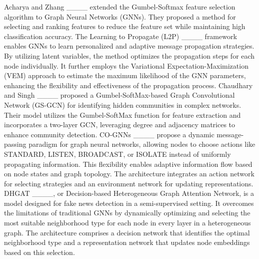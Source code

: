Acharya and Zhang ____ extended the Gumbel-Softmax feature selection algorithm to Graph Neural Networks (GNNs). They proposed a method for selecting and ranking features to reduce the feature set while maintaining high classification accuracy. 
The Learning to Propagate (L2P) ____ framework enables GNNs to learn personalized and adaptive message propagation strategies. By utilizing latent variables, the method optimizes the propagation steps for each node individually. It further employs the Variational Expectation-Maximization (VEM) approach to estimate the maximum likelihood of the GNN parameters, enhancing the flexibility and effectiveness of the propagation process.
Chaudhary and Singh ____ proposed a Gumbel-SoftMax-based Graph Convolutional Network (GS-GCN) for identifying hidden communities in complex networks. Their model utilizes the Gumbel-SoftMax function for feature extraction and incorporates a two-layer GCN, leveraging degree and adjacency matrices to enhance community detection.
CO-GNNs ____ propose a dynamic message-passing paradigm for graph neural networks, allowing nodes to choose actions like STANDARD, LISTEN, BROADCAST, or ISOLATE instead of uniformly propagating information. This flexibility enables adaptive information flow based on node states and graph topology. The architecture integrates an action network for selecting strategies and an environment network for updating representations.
DHGAT ____, or Decision-based Heterogeneous Graph Attention Network, is a model designed for fake news detection in a semi-supervised setting. It overcomes the limitations of traditional GNNs by dynamically optimizing and selecting the most suitable neighborhood type for each node in every layer in a heterogeneous graph. The architecture comprises a decision network that identifies the optimal neighborhood type and a representation network that updates node embeddings based on this selection.

